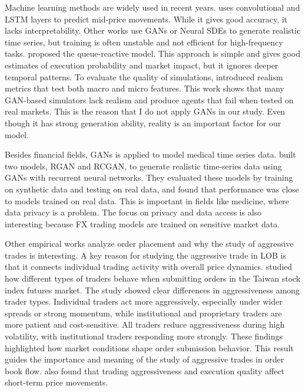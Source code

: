 \cite{coletta2021towards}
Machine learning methods are widely used in recent years. \cite{briola_deep_2024} uses convolutional and LSTM layers to predict mid-price movements. While it gives good accuracy, it lacks interpretability. Other works use GANs \citep{brophy_quick_2019} or Neural SDEs \citep{issa_non-adversarial_2023} to generate realistic time series, but training is often unstable and not efficient for high-frequency tasks. \cite{huang_simulating_2014} proposed the queue-reactive model. This approach is simple and gives good estimates of execution probability and market impact, but it ignores deeper temporal patterns. To evaluate the quality of simulations, \cite{vyetrenko_get_2019} introduced realism metrics that test both macro and micro features. This work shows that many GAN-based simulators lack realism and produce agents that fail when tested on real markets. This is the reason that I do not apply GANs in our study. Even though it has strong generation ability, reality is an important factor for our model.

Besides financial fields, GANs is applied to model medical time series data. \cite{esteban_real-valued_2017} built two models, RGAN and RCGAN, to generate realistic time-series data using GANs with recurrent neural networks. They evaluated these models by training on synthetic data and testing on real data, and found that performance was close to models trained on real data. This is important in fields like medicine, where data privacy is a problem. The focus on privacy and data access is also interesting because FX trading models are trained on sensitive market data.

Other empirical works analyze order placement and why the study of aggressive trades is interesting. A key reason for studying the aggressive trade in LOB is that it connects individual trading activity with overall price dynamics. \cite{chiu_order_2017} studied how different types of traders behave when submitting orders in the Taiwan stock index futures market. The study showed clear differences in aggressiveness among trader types. Individual traders act more aggressively, especially under wider spreads or strong momentum, while institutional and proprietary traders are more patient and cost-sensitive. All traders reduce aggressiveness during high volatility, with institutional traders responding more strongly. These findings highlighted how market conditions shape order submission behavior. This result guides the importance and meaning of the study of aggressive trades in order book flow. \cite{HUNG2019231} also found that trading aggressiveness and execution quality affect short-term price movements. 

